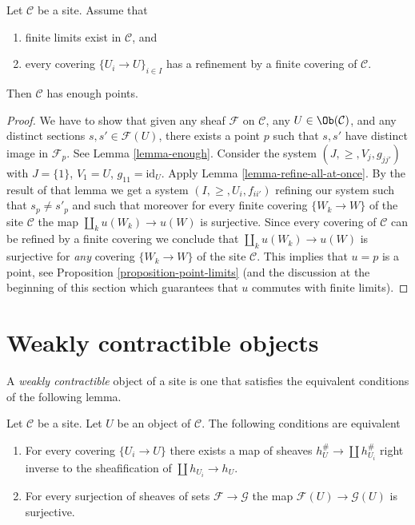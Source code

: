 \begin{proposition}
\label{proposition-criterion-points}
Let $\mathcal{C}$ be a site. Assume that
\begin{enumerate}
\item finite limits exist in $\mathcal{C}$, and
\item every covering $\{U_i \to U\}_{i \in I}$
has a refinement by a finite covering of $\mathcal{C}$.
\end{enumerate}
Then $\mathcal{C}$ has enough points.
\end{proposition}

\begin{proof}
We have to show that given any sheaf
$\mathcal{F}$ on $\mathcal{C}$, any $U \in \Ob(\mathcal{C})$,
and any distinct sections $s, s' \in \mathcal{F}(U)$, there exists
a point $p$ such that $s, s'$ have distinct image in
$\mathcal{F}_p$. See Lemma \ref{lemma-enough}.
Consider the system $(J, \geq, V_j, g_{jj'})$
with $J = \{1\}$, $V_1 = U$, $g_{11} = \text{id}_U$.
Apply Lemma \ref{lemma-refine-all-at-once}.
By the result of that lemma we get a system
$(I, \geq, U_i, f_{ii'})$ refining our system such
that $s_p \not = s'_p$ and such that moreover for every
finite covering $\{W_k \to W\}$ of the site $\mathcal{C}$ the map
$\coprod_k u(W_k) \to u(W)$ is surjective.
Since every covering of $\mathcal{C}$ can be refined by
a finite covering we conclude that
$\coprod_k u(W_k) \to u(W)$ is surjective for {\it any}
covering $\{W_k \to W\}$ of the site $\mathcal{C}$.
This implies that $u = p$ is a point, see
Proposition \ref{proposition-point-limits} (and the discussion
at the beginning of this section which guarantees that $u$
commutes with finite limits).
\end{proof}





\section{Weakly contractible objects}
\label{section-w-contractible}

\noindent
A {\it weakly contractible} object of a site is one that satisfies
the equivalent conditions of the following lemma.

\begin{lemma}
\label{lemma-w-contractible}
Let $\mathcal{C}$ be a site. Let $U$ be an object of $\mathcal{C}$.
The following conditions are equivalent
\begin{enumerate}
\item For every covering $\{U_i \to U\}$ there exists a map of
sheaves $h_U^\# \to \coprod h_{U_i}^\#$ right inverse to the sheafification
of $\coprod h_{U_i} \to h_U$.
\item For every surjection of sheaves of sets $\mathcal{F} \to \mathcal{G}$
the map $\mathcal{F}(U) \to \mathcal{G}(U)$ is surjective.
\end{enumerate}
\end{lemma}


